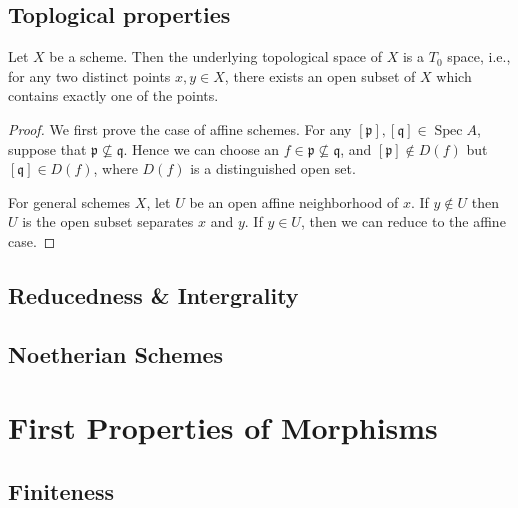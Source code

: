 \documentclass[11pt]{article}
\newcommand{\Spec}{\operatorname{Spec}}
\begin{document}
\subsection{Toplogical properties}


\begin{proposition}
    \cite[Proposition 3.25]{GortzWedhorn} 
    Let $ X $ be a scheme. Then the underlying topological space of $ X $ is a $ T_{0} $ space, 
    i.e., for any two distinct points $ x,y \in X $, there exists an open subset of $ X $ 
    which contains exactly one of the points. 
\end{proposition}

\begin{proof}
    We first prove the case of affine schemes. For any $ [\mathfrak{p}],[\mathfrak{q}] \in \Spec A $, 
    suppose that $ \mathfrak{p} \not \subseteq \mathfrak{q} $. Hence we can choose an 
    $ f \in \mathfrak{p} \not \subseteq \mathfrak{q}$, and $ [\mathfrak{p}] \notin D(f) $ but $ [\mathfrak{q}] \in D(f) $, 
    where $ D(f) $ is a distinguished open set. 

    For general schemes $ X $, let $ U $ be an open affine neighborhood of $ x $. 
    If $ y \notin U $ then $ U $ is the open subset separates $ x $ and $ y $. 
    If $ y \in U $, then we can reduce to the affine case. 
\end{proof}


\subsection{Reducedness \& Intergrality}

\begin{proposition}
    \cite[Exercise II.2.3]{hartsAG}
\end{proposition}

\subsection{Noetherian Schemes}



\section{First Properties of Morphisms}

\subsection{Finiteness}
\end{document}
